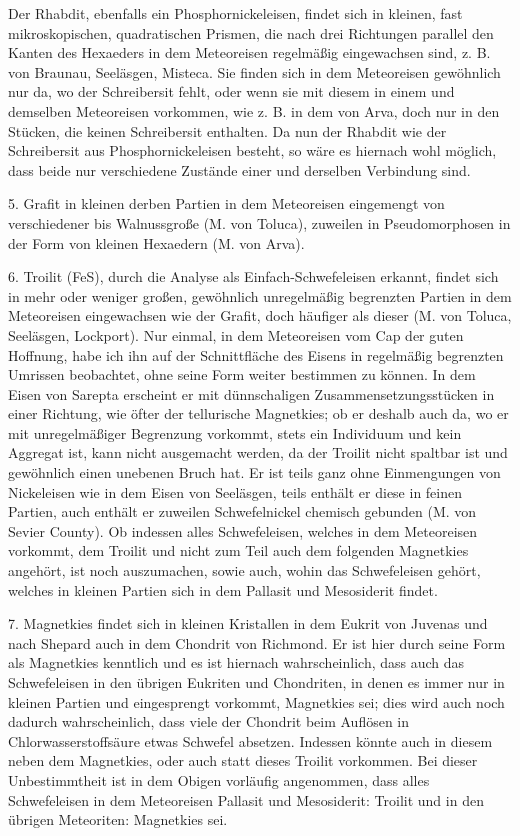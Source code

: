 \documentclass[a4paper, 11pt, oneside]{article}
\begin{document}
Der Rhabdit, ebenfalls ein Phosphornickeleisen, findet sich in kleinen, fast mikroskopischen, quadratischen Prismen, die nach drei Richtungen parallel den Kanten des Hexaeders in dem Meteoreisen regelmäßig eingewachsen sind, z. B. von Braunau, Seeläsgen, Misteca. Sie finden sich in dem Meteoreisen gewöhnlich nur da, wo der Schreibersit fehlt, oder wenn sie mit diesem in einem und demselben Meteoreisen vorkommen, wie z. B. in dem von Arva, doch nur in den Stücken, die keinen Schreibersit enthalten. Da nun der Rhabdit wie der Schreibersit aus Phosphornickeleisen besteht, so wäre es hiernach wohl möglich, dass beide nur verschiedene Zustände einer und derselben Verbindung sind.

5. Grafit in kleinen derben Partien in dem Meteoreisen eingemengt von verschiedener bis Walnussgroße (M. von Toluca), zuweilen in Pseudomorphosen in der Form von kleinen Hexaedern (M. von Arva).

6. Troilit (FeS), durch die Analyse als Einfach-Schwefeleisen erkannt, findet sich in mehr oder weniger großen, gewöhnlich unregelmäßig begrenzten Partien in dem Meteoreisen eingewachsen wie der Grafit, doch häufiger als dieser (M. von Toluca, Seeläsgen, Lockport). Nur einmal, in dem Meteoreisen vom Cap der guten Hoffnung, habe ich ihn auf der Schnittfläche des Eisens in regelmäßig begrenzten Umrissen beobachtet, ohne seine Form weiter bestimmen zu können. In dem Eisen von Sarepta erscheint er mit dünnschaligen Zusammensetzungsstücken in einer Richtung, wie öfter der tellurische Magnetkies; ob er deshalb auch da, wo er mit unregelmäßiger Begrenzung vorkommt, stets ein Individuum und kein Aggregat ist, kann nicht ausgemacht werden, da der Troilit nicht spaltbar ist und gewöhnlich einen unebenen Bruch hat. Er ist teils ganz ohne Einmengungen von Nickeleisen wie in dem Eisen von Seeläsgen, teils enthält er diese in feinen Partien, auch enthält er zuweilen Schwefelnickel chemisch gebunden (M. von Sevier County). Ob indessen alles Schwefeleisen, welches in dem Meteoreisen vorkommt, dem Troilit und nicht zum Teil auch dem folgenden Magnetkies angehört, ist noch auszumachen, sowie auch, wohin das Schwefeleisen gehört, welches in kleinen Partien sich in dem Pallasit und Mesosiderit findet.

7. Magnetkies findet sich in kleinen Kristallen in dem Eukrit von Juvenas und nach Shepard auch in dem Chondrit von Richmond. Er ist hier durch seine Form als Magnetkies kenntlich und es ist hiernach wahrscheinlich, dass auch das Schwefeleisen in den übrigen Eukriten und Chondriten, in denen es immer nur in kleinen Partien und eingesprengt vorkommt, Magnetkies sei; dies wird auch noch dadurch wahrscheinlich, dass viele der Chondrit beim Auflösen in Chlorwasserstoffsäure etwas Schwefel absetzen. Indessen könnte auch in diesem neben dem Magnetkies, oder auch statt dieses Troilit vorkommen. Bei dieser Unbestimmtheit ist in dem Obigen vorläufig angenommen, dass alles Schwefeleisen in dem Meteoreisen Pallasit und Mesosiderit: Troilit und in den übrigen Meteoriten: Magnetkies sei.
\end{document}
